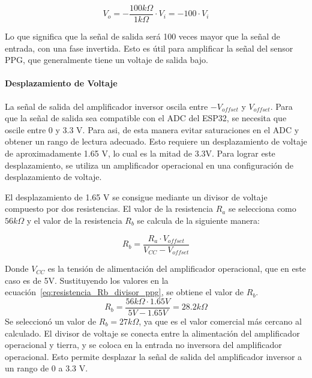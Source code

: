         \begin{equation}
            \label{eq:ganancia_amplificador_inversor_ppg_valor}
            V_o = - \frac{100k\Omega}{1k\Omega} \cdot V_i = -100 \cdot V_i
        \end{equation}

        Lo que significa que la señal de salida será 100 veces mayor que la señal de entrada, con una fase invertida. Esto es útil para amplificar la señal del sensor PPG, que generalmente tiene un voltaje de salida bajo.
        
        \paragraph{Desplazamiento de Voltaje}  
        La señal de salida del amplificador inversor oscila entre $-V_{offset}$ y $V_{offset}$. Para que la señal de salida sea compatible con el ADC del ESP32, se necesita que oscile entre 0 y 3.3 V. Para asi, de esta manera evitar saturaciones en el ADC y obtener un rango de lectura adecuado. Esto requiere un desplazamiento de voltaje de aproximadamente 1.65 V, lo cual es la mitad de 3.3V. Para lograr este desplazamiento, se utiliza un amplificador operacional en una configuración de desplazamiento de voltaje. 

        El desplazamiento de 1.65 V se consigue mediante un divisor de voltaje compuesto por dos resistencias. 
        El valor de la resistencia $R_a$ se selecciona como $56k\Omega$ y el valor de la resistencia $R_b$ se calcula de la siguiente manera:

        \begin{equation}
            \label{eq:resistencia_Rb_divisor_ppg}
            R_b = \frac{R_a \cdot V_{offset}}{V_{CC} - V_{offset}}
        \end{equation}

        Donde $V_{CC}$ es la tensión de alimentación del amplificador operacional, que en este caso es de 5V. Sustituyendo los valores en la ecuación~\ref{eq:resistencia_Rb_divisor_ppg}, se obtiene el valor de $R_b$.
        \begin{equation}
            R_b = \frac{56k\Omega \cdot 1.65V}{5V - 1.65V} = 28.2 k\Omega
        \end{equation}
        Se seleccionó un valor de $R_b = 27 k\Omega$, ya que es el valor comercial más cercano al calculado. El divisor de voltaje se conecta entre la alimentación del amplificador operacional y tierra, y se coloca en la entrada no inversora del amplificador operacional. Esto permite desplazar la señal de salida del amplificador inversor a un rango de 0 a 3.3 V.

